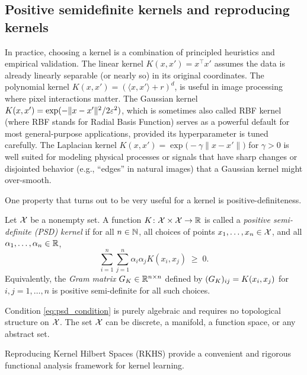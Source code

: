 \subsection{Positive semidefinite kernels and reproducing kernels}

In practice, choosing a kernel is a combination of principled heuristics and empirical validation.
The linear kernel $K(x,x') = x^\top x'$ assumes the data is already linearly separable (or nearly so) in its original coordinates.
The polynomial kernel $K(x,x') = 
(\langle x, x' \rangle + r)^d$,
is useful in image processing where pixel interactions matter. The Gaussian kernel $K(x,x') = \exp (-\|x-x'\|^2/2\varepsilon^2)$, which is sometimes also called RBF kernel (where RBF stands for Radial Basis Function) serves as a powerful default for most general-purpose applications, provided its hyperparameter is tuned carefully.
The Laplacian kernel $K(x,x') = \exp\bigl(-\gamma\|x-x'\|\bigr)$ for $\gamma>0$ is well suited for modeling physical processes or signals that have sharp changes or disjointed behavior (e.g., ``edges'' in natural images) that a Gaussian kernel might over-smooth.

One property that turns out to be very useful for a kernel is positive-definiteness.



\begin{definition}\label{def:psd_kernel}
Let $\mathcal{X}$ be a nonempty set.  A function $K\colon\mathcal{X}\times\mathcal{X}\to\mathbb{R}$ is called
a \emph{positive semi-definite (PSD) kernel}  if for all
$n\in\mathbb{N}$, all choices of points $x_1,\ldots,x_n\in\mathcal{X}$, and all
$\alpha_1,\ldots,\alpha_n\in\mathbb{R}$,
\begin{equation}\label{eq:psd_condition}
  \sum_{i=1}^n\sum_{j=1}^n \alpha_i\alpha_j K(x_i,x_j) \;\ge\; 0.
\end{equation}
Equivalently, the \emph{Gram matrix} ${G_K}\in\mathbb{R}^{n\times n}$ defined by
$({G_K})_{ij} = K(x_i,x_j)$ for $i,j =1,\dots,n$ is positive semi-definite for all such choices.
\end{definition}


Condition \eqref{eq:psd_condition} is purely algebraic and requires no topological
structure on $\mathcal{X}$.  The set $\mathcal{X}$ can be discrete, a manifold, a function space,
or any abstract set.






Reproducing Kernel Hilbert Spaces (RKHS) provide a convenient and rigorous functional analysis framework
for kernel learning.

